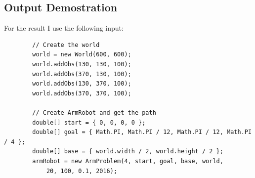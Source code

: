 \documentclass{article}
\begin{document}
\subsection{Output Demostration}
For the result I use the following input:
\begin{lstlisting}
		// Create the world
		world = new World(600, 600);
		world.addObs(130, 130, 100);
		world.addObs(370, 130, 100);
		world.addObs(130, 370, 100);
		world.addObs(370, 370, 100);

		// Create ArmRobot and get the path
		double[] start = { 0, 0, 0, 0 };
		double[] goal = { Math.PI, Math.PI / 12, Math.PI / 12, Math.PI / 4 };
		double[] base = { world.width / 2, world.height / 2 };
		armRobot = new ArmProblem(4, start, goal, base, world, 
			20, 100, 0.1, 2016);
 \end{lstlisting}
\end{document}
